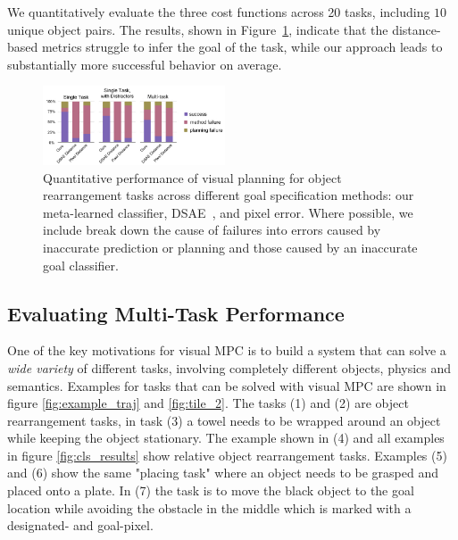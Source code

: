 We quantitatively evaluate the three cost functions across 20 tasks, including $10$ unique object pairs. The results, shown in Figure~\ref{fig:cls_charts}, indicate that the distance-based metrics struggle to infer the goal of the task, while our approach leads to substantially more successful behavior on average.








\begin{figure}
    \centering
    \includegraphics[width=0.48\textwidth]{images_cls/cls_charts.jpeg}
    \caption{\small Quantitative performance of visual planning for object rearrangement tasks across different goal specification methods: our meta-learned classifier, DSAE~\cite{dsae}, and pixel error. Where possible, we include break down the cause of failures into errors caused by inaccurate prediction or planning and those caused by an inaccurate goal classifier.}
    \label{fig:cls_charts}
    \vspace{-0.3cm}
\end{figure}


\subsection{Evaluating Multi-Task Performance}
\label{subsec:multi_task_bench}
One of the key motivations for visual MPC is to build a system that can solve a \emph{wide variety} of different tasks, involving completely different objects, physics and semantics. Examples for tasks that can be solved with visual MPC are shown in figure \ref{fig:example_traj} and \ref{fig:tile_2}. The tasks (1) and (2) are object rearrangement tasks, in task (3) a towel needs to be wrapped around an object while keeping the object stationary. The example shown in (4) and all examples in figure \ref{fig:cls_results} show relative object rearrangement tasks. Examples (5) and (6) show the same "placing task" where an object needs to be grasped and placed onto a plate. In (7) the task is to move the black object to the goal location while avoiding the obstacle in the middle which is marked with a designated- and goal-pixel.

